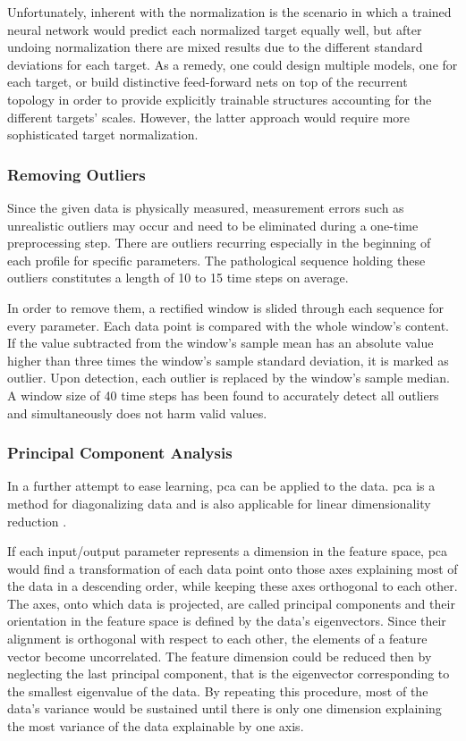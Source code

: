 Unfortunately, inherent with the normalization is the scenario in which a trained neural network would predict each normalized target equally well, but after undoing normalization there are mixed results due to the different standard deviations for each target.
As a remedy, one could design multiple models, one for each target, or build distinctive feed-forward nets on top of the recurrent topology in order to provide explicitly trainable structures accounting for the different targets' scales.
However, the latter approach would require more sophisticated target normalization.

\subsubsection{Removing Outliers}
Since the given data is physically measured, measurement errors such as unrealistic outliers may occur and need to be eliminated during a one-time preprocessing step.
There are outliers recurring especially in the beginning of each profile for specific parameters.
The pathological sequence holding these outliers constitutes a length of 10 to 15 time steps on average.

In order to remove them, a rectified window is slided through each sequence for every parameter.
Each data point is compared with the whole window's content.
If the value subtracted from the window's sample mean has an absolute value higher than three times the window's sample standard deviation, it is marked as outlier.
Upon detection, each outlier is replaced by the window's sample median.
A window size of 40 time steps has been found to accurately detect all outliers and simultaneously does not harm valid values.

\subsubsection{Principal Component Analysis}
In a further attempt to ease learning, \gls{pca} can be applied to the data.
\gls{pca} is a method for diagonalizing data and is also applicable for linear dimensionality reduction \cite{Bishop2006}.

If each input/output parameter represents a dimension in the feature space, \gls{pca} would find a transformation of each data point onto those axes explaining most of the data in a descending order, while keeping these axes orthogonal to each other.
The axes, onto which data is projected, are called principal components and their orientation in the feature space is defined by the data's eigenvectors.
Since their alignment is orthogonal with respect to each other, the elements of a feature vector become uncorrelated.
The feature dimension could be reduced then by neglecting the last principal component, that is the eigenvector corresponding to the smallest eigenvalue of the data.
By repeating this procedure, most of the data's variance would be sustained until there is only one dimension explaining the most variance of the data explainable by one axis.

